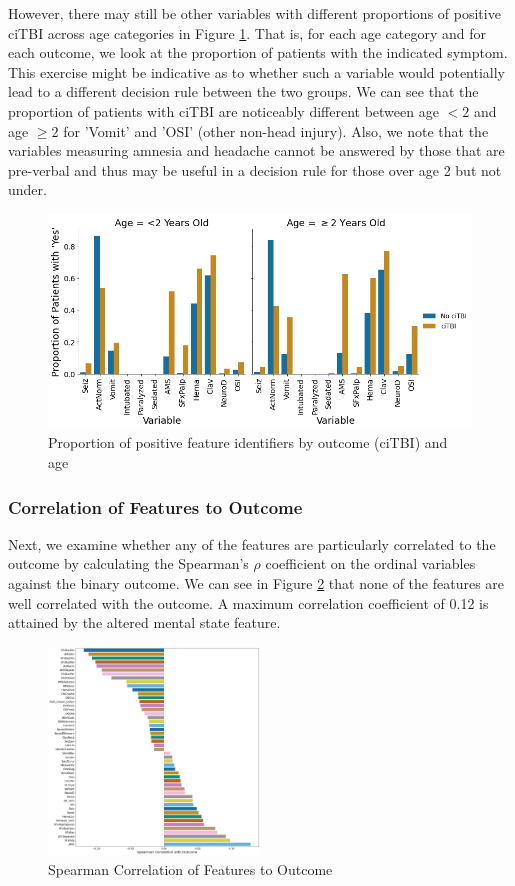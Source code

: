 \documentclass[11pt, letterpaper]{amsart}
\let\Oldsubsubsection\subsubsection
\renewcommand{\subsubsection}{\FloatBarrier\Oldsubsubsection}
\begin{document}
However, there may still be other variables with different proportions of positive ciTBI across age categories in Figure \ref{fig:age_covariate}. That is, for each age category and for each outcome, we look at the proportion of patients with the indicated symptom. This exercise might be indicative as to whether such a variable would potentially lead to a different decision rule between the two groups. We can see that the proportion of patients with ciTBI are noticeably different between age $<2$ and age $\geq 2$ for 'Vomit' and 'OSI' (other non-head injury). Also, we note that the variables measuring amnesia and headache cannot be answered by those that are pre-verbal and thus may be useful in a decision rule for those over age 2 but not under.
\begin{figure}
	\centering
	\includegraphics[width=\textwidth]{covariate_by_age.png}
	\caption{Proportion of positive feature identifiers by outcome (ciTBI) and age}\label{fig:age_covariate}
\end{figure}

\subsubsection{Correlation of Features to Outcome}

Next, we examine whether any of the features are particularly correlated to the outcome by calculating the Spearman's $\rho$ coefficient on the ordinal variables against the binary outcome. We can see in Figure \ref{fig:spearman_corr_to_outcome} that none of the features are well correlated with the outcome. A maximum correlation coefficient of 0.12 is attained by the altered mental state feature.
\begin{figure}
	\centering
	\includegraphics[width=0.5\textwidth]{spearman_corr_to_outcome.png}
	\caption{Spearman Correlation of Features to Outcome}\label{fig:spearman_corr_to_outcome}
\end{figure}
\end{document}
